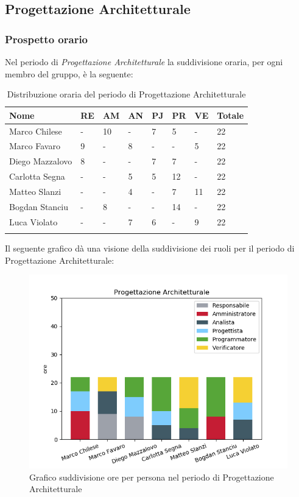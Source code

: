 \subsection{Progettazione Architetturale}
\subsubsection{Prospetto orario}

Nel periodo di \textit{Progettazione Architetturale} la suddivisione oraria, per ogni membro del gruppo, è la seguente:


\begin{longtable}{|C{.30\textwidth}|C{.06\textwidth}|C{.06\textwidth}|C{.06\textwidth} | C{.06\textwidth}| C{.06\textwidth} | C{.06\textwidth} | C{.10\textwidth} |}
\hline
\textbf{Nome} & \textbf{RE} & \textbf{AM} & \textbf{AN} & \textbf{PJ} & \textbf{PR} & \textbf{VE} & \textbf{Totale}\\
\hline 
Marco Chilese & - & 10 & - & 7 & 5 & - & 22 \\
\hline
Marco Favaro & 9 & - & 8 & - & - & 5 & 22 \\
\hline
Diego Mazzalovo & 8 & - & - & 7 & 7 & - & 22 \\ 
\hline
Carlotta Segna & - & - & 5 & 5 & 12 & - & 22 \\
\hline
Matteo Slanzi & - & - & 4 & - & 7 & 11 & 22 \\
\hline
Bogdan Stanciu & - & 8 & - & - & 14 & - & 22 \\
\hline
Luca Violato & - & - & 7 & 6 & - & 9 & 22 \\
\hline 

\caption{Distribuzione oraria del periodo di Progettazione Architetturale}
\label{Distribuzione oraria del periodo di pa}
\end{longtable}

Il seguente grafico dà una visione della suddivisione dei ruoli per il periodo di Progettazione Architetturale:

\begin{figure}[H]
	\centering
  		\includegraphics[width=1\linewidth]{./images/fig_pa.png}
  		\caption{Grafico suddivisione ore per persona nel periodo di Progettazione Architetturale}
  		\label{fig:grafico suddivione ruoli periodo di pa}
\end{figure}



